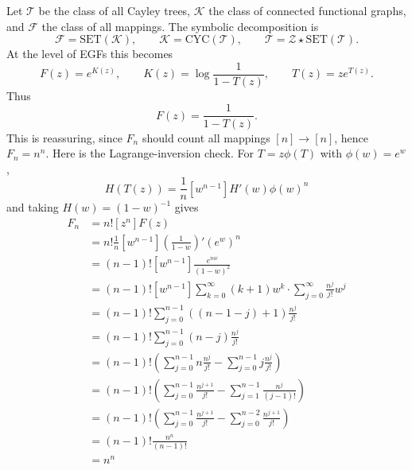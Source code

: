 Let $\mathcal{T}$ be the class of all Cayley trees, $\mathcal{K}$ the class of connected
functional graphs, and $\mathcal{F}$ the class of all mappings. The symbolic decomposition is
\begin{equation*}
    \mathcal{F} = \mathrm{SET}(\mathcal{K}), \qquad
    \mathcal{K} = \mathrm{CYC}(\mathcal{T}), \qquad
    \mathcal{T} = \mathcal{Z} \star \mathrm{SET}(\mathcal{T}).
\end{equation*}
At the level of EGFs this becomes
\begin{equation*}
    F(z) = e^{K(z)}, \qquad
    K(z) = \log\frac{1}{1 - T(z)}, \qquad
    T(z) = ze^{T(z)}.
\end{equation*}
Thus
\begin{equation*}
    F(z) = \frac{1}{1 - T(z)}.
\end{equation*}
This is reassuring, since $F_n$ should count all mappings $[n]\to[n]$, hence $F_n=n^n$.
Here is the Lagrange-inversion check. For $T=z\phi(T)$ with $\phi(w)=e^w$,
\begin{equation*}
    [z^{n}] H(T(z)) = \frac{1}{n} [w^{n - 1}] H'(w)\phi(w)^{n}
\end{equation*}
and taking $H(w) = (1 - w)^{-1}$ gives
\begin{equation*}
    \begin{aligned}
        F_{n}
        &= n![z^{n}] F(z) \\
        &= n!\frac{1}{n} [w^{n - 1}] \left(\frac{1}{1 - w} \right)'(e^{w})^{n} \\
        &= (n - 1)![w^{n - 1}] \frac{e^{nw}}{(1 - w)^{2}} \\
        &= (n - 1)![w^{n - 1}] \sum_{k = 0}^{\infty}(k + 1)w^{k} \cdot \sum_{j = 0}^{\infty} \frac{n^{j}}{j!}w^{j} \\
        &= (n - 1)!\sum_{j = 0}^{n - 1}((n - 1 - j) + 1)\frac{n^{j}}{j!} \\
        &= (n - 1)!\sum_{j = 0}^{n - 1}(n - j)\frac{n^{j}}{j!} \\
        &= (n - 1)!\left(\sum_{j = 0}^{n - 1} n \frac{n^{j}}{j!} - \sum_{j = 0}^{n - 1} j \frac{n^{j}}{j!}\right) \\
        &= (n - 1)!\left(\sum_{j = 0}^{n - 1} \frac{n^{j + 1}}{j!} - \sum_{j = 1}^{n - 1} \frac{n^{j}}{(j - 1)!}\right) \\
        &= (n - 1)!\left(\sum_{j = 0}^{n - 1} \frac{n^{j + 1}}{j!} - \sum_{j = 0}^{n - 2} \frac{n^{j + 1}}{j!}\right) \\
        &= (n - 1)!\frac{n^{n}}{(n - 1)!} \\
        &= n^{n}
    \end{aligned}
\end{equation*}

